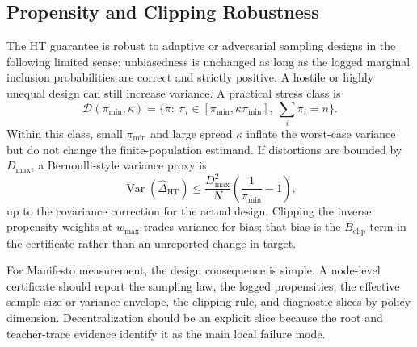 \subsection{Propensity and Clipping Robustness}

The HT guarantee is robust to adaptive or adversarial sampling designs in the
following limited sense: unbiasedness is unchanged as long as the logged
marginal inclusion probabilities are correct and strictly positive. A hostile
or highly unequal design can still increase variance. A practical stress
class is
\[
  \mathcal D(\pi_{\min},\kappa)
  =
  \{\pi:\ \pi_i\in[\pi_{\min},\kappa\pi_{\min}],
  \ \sum_i\pi_i=n\}.
\]
Within this class, small \(\pi_{\min}\) and large spread \(\kappa\) inflate
the worst-case variance but do not change the finite-population estimand. If
distortions are bounded by \(D_{\max}\), a Bernoulli-style variance proxy is
\[
  \operatorname{Var}(\widehat\Delta_{\mathrm{HT}})
  \le
  \frac{D_{\max}^2}{N}
  \left(\frac{1}{\pi_{\min}}-1\right),
\]
up to the covariance correction for the actual design. Clipping the inverse
propensity weights at \(w_{\max}\) trades variance for bias; that bias is the
\(B_{\mathrm{clip}}\) term in the certificate rather than an unreported
change in target.

For Manifesto measurement, the design consequence is simple. A node-level
certificate should report the sampling law, the logged propensities, the
effective sample size or variance envelope, the clipping rule, and diagnostic
slices by policy dimension. Decentralization should be an explicit slice
because the root and teacher-trace evidence identify it as the main local
failure mode.
